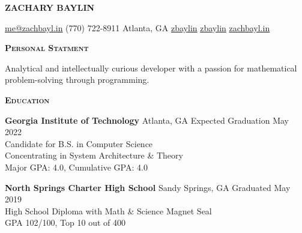 \documentclass{article}
\newcommand{\sectionHeader}[1]{{\large \textbf{\textsc{#1}}}\hspace{5pt}\xrfill[.5ex]{.4pt}}
\newcommand{\headerInfoSpacer}{\hspace{10pt}}
\begin{document}
  \begin{center}
    \textbf{{\Huge Z}{\huge ACHARY} \hspace{1pt} {\Huge B}{\huge AYLIN}}

    \vspace{3pt}

    \href{mailto:me@zachbayl.in}{\faEnvelope \hspace{1pt} me@zachbayl.in} \headerInfoSpacer \faPhone \hspace{1pt} (770) 722-8911 \headerInfoSpacer {} Atlanta, GA \headerInfoSpacer \href{https://linkedin.com/in/zbaylin}{\faLinkedin \hspace{1pt} zbaylin} \headerInfoSpacer \href{https://github.com/zbaylin}{\faGithub \hspace{1pt} zbaylin} \headerInfoSpacer \href{https://zachbayl.in}{\faGlobeAmericas \hspace{1pt} zachbayl.in}\\
  \end{center}

  \sectionHeader{Personal Statment}

  \vspace{3pt}

  Analytical and intellectually curious developer with a passion for mathematical problem-solving through programming.

  \vspace{8pt}

  \sectionHeader{Education}

  \vspace{3pt}

  \textbf{Georgia Institute of Technology} \hspace{3pt} {\footnotesize {}} Atlanta, GA \hspace*{\fill} {\footnotesize {}} \hspace{1pt} Expected Graduation May 2022\\
  Candidate for B.S. in Computer Science\\
  Concentrating in System Architecture \& Theory\\
  Major GPA: 4.0, Cumulative GPA: 4.0

  \vspace{5pt}

  \textbf{North Springs Charter High School} \hspace{3pt} {\footnotesize {}} Sandy Springs, GA \hspace*{\fill} {\footnotesize {}} \hspace{1pt} Graduated May 2019\\
  High School Diploma with Math \& Science Magnet Seal\\
  GPA 102/100, Top 10 out of 400
\end{document}
